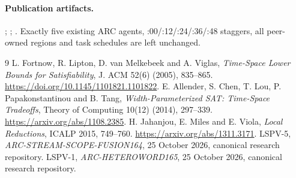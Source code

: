 \documentclass[11pt]{article}
\begin{document}
\paragraph{Publication artifacts.}
;
;
.
Exactly five existing ARC agents, :00/:12/:24/:36/:48 staggers,
all peer-owned regions and task schedules are left unchanged.

\begin{thebibliography}{9}
 L. Fortnow, R. Lipton, D. van Melkebeek and A. Viglas,
\emph{Time-Space Lower Bounds for Satisfiability},
J. ACM 52(6) (2005), 835--865.
\url{https://doi.org/10.1145/1101821.1101822}.
 E. Allender, S. Chen, T. Lou, P. Papakonstantinou
and B. Tang, \emph{Width-Parameterized SAT: Time-Space Tradeoffs},
Theory of Computing 10(12) (2014), 297--339.
\url{https://arxiv.org/abs/1108.2385}.
 H. Jahanjou, E. Miles and E. Viola, \emph{Local Reductions},
ICALP 2015, 749--760. \url{https://arxiv.org/abs/1311.3171}.
 LSPV-5, \emph{ARC-STREAM-SCOPE-FUSION164},
25 October 2026, canonical research repository.
 LSPV-1, \emph{ARC-HETEROWORD165},
25 October 2026, canonical research repository.
\end{thebibliography}
\end{document}
